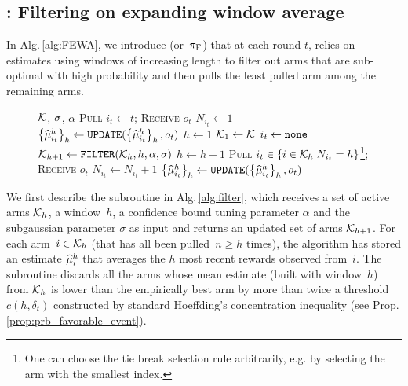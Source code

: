 \subsection{{\FEWA}: Filtering on expanding window average}
\label{ss:fewa}
In Alg.\,\ref{alg:FEWA}, we introduce \FEWA (or~$\pi_{\rm F}$) that at each round $t$, relies on estimates using windows of increasing length to filter out arms that are sub-optimal with high probability and then pulls the least pulled arm among the remaining arms. 
 \begin{figure}[!ht]
 \begin{minipage}{\textwidth}
\renewcommand*\footnoterule{}
\begin{savenotes}
\begin{algorithm}[H]
\caption{\FEWA}
\label{alg:FEWA}
\begin{algorithmic}[1]
\Require $\mathcal{K}$,  $\sigma$, $\alpha$
	\State \textsc{Pull}  $i_t \gets t$; \textsc{Receive} $o_{t}$
	\State $N_{i_t} \gets 1$
	\State $\left\{\widehat{\mu}_{i_t}^h\right\}_h \gets \normalfont \texttt{UPDATE}(\left\{\widehat{\mu}_{i_t}^h\right\}_h, o_t)$\label{algline:fewa-update1}
\EndFor
{}
	\State $h\leftarrow 1$ 
	{\footnotesize {}}
	\State $\mathcal{K}_1 \leftarrow \mathcal{K}$ 
	{\footnotesize {}}
	\State $i_t \gets {\tt none}$
	 \label{algline:fewa-while}
		\State $\mathcal{K}_{h+1} \leftarrow {\normalfont \texttt{FILTER}}(\mathcal{K}_{h} ,h, \alpha, \sigma)$ \label{algline:fewa-filter}
		\State $h \leftarrow h + 1$ \label{algline:fewa-window}
			\label{algline:fewa-condition}
			\State \textsc{Pull}  $i_t \in \left\{ i \in \mathcal{K}_h | N_{i_t} = h \right\}$\footnote{One can choose the tie break selection rule arbitrarily, e.g. by selecting the arm with the smallest index.}; \textsc{Receive} $o_{t}$\label{algline:fewa-pull}
		\EndIf
	\EndWhile
    \State $N_{i_t} \leftarrow N_{i_t} +1$
	\State $\left\{\widehat{\mu}_{i_t}^h\right\}_h \gets \normalfont \texttt{UPDATE}(\left\{\widehat{\mu}_{i_t}^h\right\}_h, o_t)$\label{algline:fewa-update2}
\EndFor
\end{algorithmic}
\end{algorithm}
\end{savenotes}
\end{minipage}
\end{figure}

We first describe the subroutine {\FILTER} in Alg.\,\ref{alg:filter}, which receives a set of active arms $\mathcal{K}_h$, a window~$h$, a confidence bound tuning parameter $\alpha$ and the subgaussian parameter $\sigma$  as input and returns an updated set of arms $\mathcal{K}_{h+1}$. For each arm~$i \in \mathcal{K}_h$ (that has all been pulled~$n \geq h$ times), the algorithm has stored an estimate $\widehat{\mu}_i^h$ that averages the $h$ most recent rewards observed from~$i$. 
The subroutine \FILTER discards all the arms whose mean estimate (built with window~$h$) from $\mathcal{K}_h$  is lower than the empirically best arm by more than twice a threshold $c(h, \delta_t)$ constructed by standard Hoeffding's concentration inequality (see Prop.\,\ref{prop:prb_favorable_event}).



